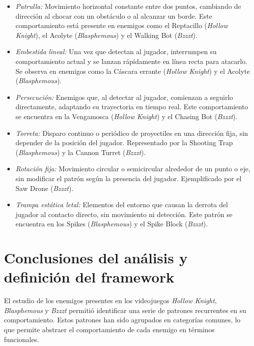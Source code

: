 \begin{itemize}
	\item \emph{Patrulla:} Movimiento horizontal constante entre dos puntos, cambiando de dirección al chocar con un obstáculo o al alcanzar un borde. Este comportamiento está presente en enemigos como el Reptacillo (\textit{Hollow Knight}), el Acolyte (\textit{Blasphemous}) y el Walking Bot (\textit{Bzzzt}).
	\item \emph{Embestida lineal:} Una vez que detectan al jugador, interrumpen su comportamiento actual y se lanzan rápidamente en línea recta para atacarlo. Se observa en enemigos como la Cáscara errante (\textit{Hollow Knight}) y el Acolyte (\textit{Blasphemous}).
	\item \emph{Persecución:} Enemigos que, al detectar al jugador, comienzan a seguirlo directamente, adaptando su trayectoria en tiempo real. Este comportamiento se encuentra en la Vengamosca (\textit{Hollow Knight}) y el Chasing Bot (\textit{Bzzzt}).
	\item \emph{Torreta:} Disparo continuo o periódico de proyectiles en una dirección fija, sin depender de la posición del jugador. Representado por la Shooting Trap (\textit{Blasphemous}) y la Cannon Turret (\textit{Bzzzt}).
	\item \emph{Rotación fija:} Movimiento circular o semicircular alrededor de un punto o eje, sin modificar el patrón según la presencia del jugador. Ejemplificado por el Saw Drone (\textit{Bzzzt}).
	\item \emph{Trampa estática letal:} Elementos del entorno que causan la derrota del jugador al contacto directo, sin movimiento ni detección. Este patrón se encuentra en los Spikes (\textit{Blasphemous}) y el Spike Block (\textit{Bzzzt}).
\end{itemize}




\section{Conclusiones del análisis y definición del framework}

El estudio de los enemigos presentes en los videojuegos \textit{Hollow Knight}, \textit{Blasphemous} y \textit{Bzzzt} permitió identificar una serie de patrones recurrentes en su comportamiento. Estos patrones han sido agrupados en categorías comunes, lo que permite abstraer el comportamiento de cada enemigo en términos funcionales.\\

